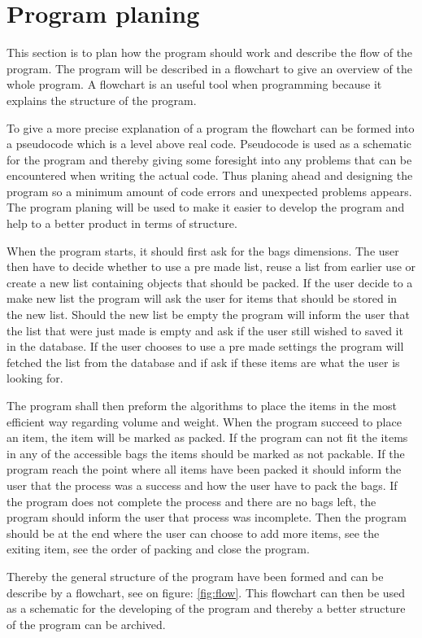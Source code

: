 \section{Program planing}
This section is to plan how the program should work and describe the flow of the program. The program will be described in a flowchart to give an overview of the whole program. A flowchart is an useful tool when programming because it explains the structure of the program.

To give a more precise explanation of a program the flowchart can be formed into a pseudocode which is a level above real code. Pseudocode is used as a schematic for the program and thereby giving some foresight into any problems that can be encountered when writing the actual code. Thus planing ahead and designing the program so a minimum amount of code errors and unexpected problems appears.
The program planing will be used to make it easier to develop the program and help to a better product in terms of structure.

When the program starts, it should first ask for the bags dimensions. The user then have to decide whether to use a pre made list, reuse a list from earlier use or create a new list containing objects that should be packed. If the user decide to a make new list the program will ask the user for items that should be stored in the new list. Should the new list be empty the program will inform the user that the list that were just made is empty and ask if the user still wished to saved it in the database.
If the user chooses to use a pre made settings the program will fetched the list from the database and if ask if these items are what the user is looking for.

The program shall then preform the algorithms to place the items in the most efficient way regarding volume and weight. When the program succeed to place an item, the item will be marked as packed. If the program can not fit the items in any of the accessible bags the items should be marked as not packable. If the program reach the point where all items have been packed it should inform the user that the process was a success and how the user have to pack the bags. If the program does not complete the process and there are no bags left, the program should inform the user that process was incomplete. Then the program should be at the end where the user can choose to add more items, see the exiting item, see the order of packing and close the program.


Thereby the general structure of the program have been formed and can be describe by a flowchart, see on figure: \ref{fig:flow}.
This flowchart can then be used as a schematic for the developing of the program and thereby a better structure of the program can be archived.